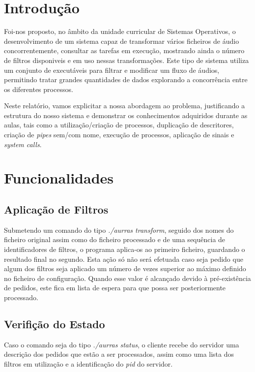 \documentclass[11pt,a4paper]{report}
\begin{document}
\tableofcontents %

\chapter{Introdução}

Foi-nos proposto, no âmbito da unidade curricular de Sistemas Operativos, o desenvolvimento de um sistema capaz de transformar vários ficheiros de áudio concorrentemente, consultar as tarefas em execução, mostrando ainda o número de filtros disponiveis e em uso nessas transformações. Este tipo de sistema utiliza um conjunto de executáveis para filtrar e modificar um fluxo de áudios, permitindo tratar grandes quantidades de dados explorando a concorrência entre os diferentes processos.

Neste relatório, vamos explicitar a nossa abordagem ao problema, justificando a estrutura do nosso sistema e demonstrar os conhecimentos adquiridos durante as aulas, tais como a utilização/criação de processos, duplicação de descritores, criação de \emph{pipes} sem/com nome, execução de processos, aplicação de sinais e \emph{system calls}.

\chapter{Funcionalidades}

\section{Aplicação de Filtros}

Submetendo um comando do tipo \emph{./aurras transform}, seguido dos nomes do ficheiro original assim como do ficheiro processado e de uma sequência de identificadores de filtros, o programa aplica-os ao primeiro ficheiro, guardando o resultado final no segundo. Esta ação só não será efetuada caso seja pedido que algum dos filtros seja aplicado um número de vezes superior ao máximo definido no ficheiro de configuração. Quando esse valor é alcançado devido à pré-existência de pedidos, este fica em lista de espera para que possa ser posteriormente processado.

\section{Verifição do Estado}

Caso o comando seja do tipo \emph{./aurras status}, o cliente recebe do servidor uma descrição dos pedidos que estão a ser processados, assim como uma lista dos filtros em utilização e a identificação do \emph{pid} do servidor.
\end{document}

